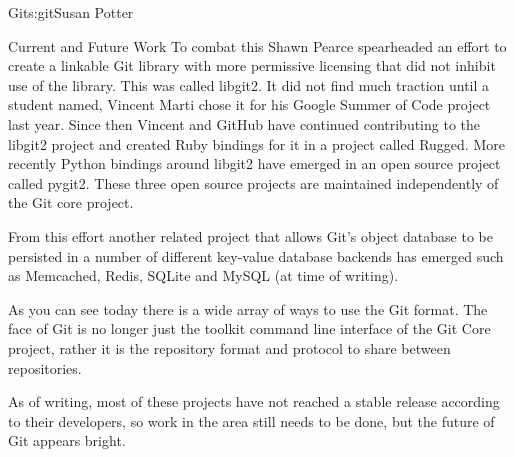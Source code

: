 \begin{aosachapter}{Git}{s:git}{Susan Potter}
\begin{aosasect1}{Current and Future Work}
To combat this Shawn Pearce spearheaded an effort to create a linkable Git
library with more permissive licensing that did not inhibit use of the
library. This was called libgit2. It did not find much traction until a
student named, Vincent Marti chose it for his Google Summer of Code project
last year. Since then Vincent and GitHub have continued contributing to the
libgit2 project and created Ruby bindings for it in a project called Rugged.
More recently Python bindings around libgit2 have emerged in an open source
project called pygit2. These three open source projects are maintained
independently of the Git core project.

From this effort another related project that allows Git's object database
to be persisted in a number of different key-value database backends has
emerged such as Memcached, Redis, SQLite and MySQL (at time of writing).

As you can see today there is a wide array of ways to use the Git format.
The face of Git is no longer just the toolkit command line interface of
the Git Core project, rather it is the repository format and protocol to
share between repositories.

As of writing, most of these projects have not reached a stable release
according to their developers, so work in the area still needs to be done,
but the future of Git appears bright.

\end{aosasect1}

\end{aosachapter}
